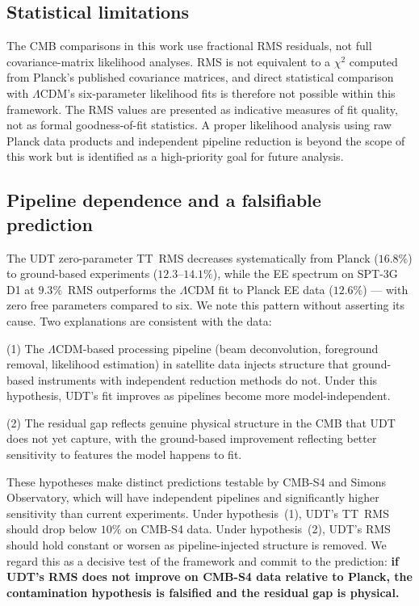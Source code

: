 \documentclass[aps,prd,twocolumn,superscriptaddress,nofootinbib,longbibliography]{revtex4-2}
\begin{document}
\subsection{Statistical limitations}

The CMB comparisons in this work use fractional RMS residuals, not
full covariance-matrix likelihood analyses.  RMS is not equivalent to
a $\chi^2$ computed from Planck's published covariance matrices, and
direct statistical comparison with $\Lambda$CDM's six-parameter
likelihood fits is therefore not possible within this framework.  The
RMS values are presented as indicative measures of fit quality, not as
formal goodness-of-fit statistics.  A proper likelihood analysis using
raw Planck data products and independent pipeline reduction is beyond
the scope of this work but is identified as a high-priority goal for
future analysis.

\subsection{Pipeline dependence and a falsifiable prediction}

The UDT zero-parameter TT~RMS decreases systematically from Planck
($16.8\%$) to ground-based experiments ($12.3$--$14.1\%$), while the
EE spectrum on SPT-3G D1 at $9.3\%$~RMS outperforms the $\Lambda$CDM
fit to Planck EE data ($12.6\%$) --- with zero free parameters
compared to six.  We note this pattern without asserting its cause.
Two explanations are consistent with the data:

(1) The $\Lambda$CDM-based processing pipeline (beam deconvolution,
foreground removal, likelihood estimation) in satellite data injects
structure that ground-based instruments with independent reduction
methods do not.  Under this hypothesis, UDT's fit improves as
pipelines become more model-independent.

(2) The residual gap reflects genuine physical structure in the CMB
that UDT does not yet capture, with the ground-based improvement
reflecting better sensitivity to features the model happens to fit.

These hypotheses make distinct predictions testable by CMB-S4 and
Simons Observatory, which will have independent pipelines and
significantly higher sensitivity than current experiments.  Under
hypothesis~(1), UDT's TT~RMS should drop below $10\%$ on CMB-S4
data.  Under hypothesis~(2), UDT's RMS should hold constant or worsen
as pipeline-injected structure is removed.  We regard this as a
decisive test of the framework and commit to the prediction: \textbf{if
UDT's RMS does not improve on CMB-S4 data relative to Planck, the
contamination hypothesis is falsified and the residual gap is
physical.}
\end{document}
